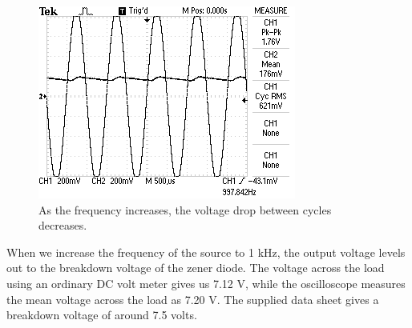 \documentclass[twocolumn,english]{IEEEtran}
\begin{document}
\begin{figure}[H]
  \begin{centering}
  \begin{center}
  \includegraphics[width=\linewidth]{./Images/DC2.png}
  \caption{As the frequency increases, the voltage drop between cycles decreases.}
  \label{fig:DC2}
  \end{center}
  \par\end{centering}
\end{figure}

When we increase the frequency of the source to 1 kHz, the output voltage levels out to the breakdown voltage of the zener diode. The voltage across the load using an ordinary DC volt meter gives us 7.12 V, while the oscilloscope measures the mean voltage across the load as 7.20 V. The supplied data sheet gives a breakdown voltage of around 7.5 volts.
\end{document}
